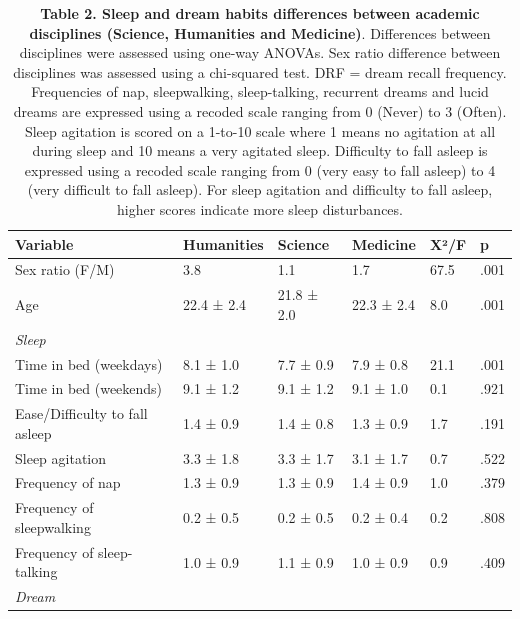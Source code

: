 
\begin{table}[!htb]
    \caption*{\textbf{Table 2. Sleep and dream habits differences between academic disciplines (Science, Humanities and Medicine)}. Differences between disciplines were assessed using one-way ANOVAs. Sex ratio difference between disciplines was assessed using a chi-squared test. DRF = dream recall frequency. Frequencies of nap, sleepwalking, sleep-talking, recurrent dreams and lucid dreams are expressed using a recoded scale ranging from 0 (Never) to 3 (Often). Sleep agitation is scored on a 1-to-10 scale where 1 means no agitation at all during sleep and 10 means a very agitated sleep. Difficulty to fall asleep is expressed using a recoded scale ranging from 0 (very easy to fall asleep) to 4 (very difficult to fall asleep). For sleep agitation and difficulty to fall asleep, higher scores indicate more sleep disturbances.}
    \begin{tabularx}{\textwidth}{bXXXll}
    \toprule
    Variable                       & Humanities & Science    & Medicine   & X²/F   & p    \\ \midrule
    Sex ratio (F/M)                & 3.8        & 1.1        & 1.7        & 67.5   & .001 \\
    Age                            & 22.4 ± 2.4 & 21.8 ± 2.0 & 22.3 ± 2.4 & 8.0    & .001 \\
    \emph{Sleep}                   &            &            &            &        &      \\
    Time in bed (weekdays)         & 8.1 ± 1.0  & 7.7 ± 0.9  & 7.9 ± 0.8  & 21.1   & .001 \\
    Time in bed (weekends)         & 9.1 ± 1.2  & 9.1 ± 1.2  & 9.1 ± 1.0  & 0.1    & .921 \\
    Ease/Difficulty to fall asleep & 1.4 ± 0.9  & 1.4 ± 0.8  & 1.3 ± 0.9  & 1.7    & .191 \\
    Sleep agitation                & 3.3 ± 1.8  & 3.3 ± 1.7  & 3.1 ± 1.7  & 0.7    & .522 \\
    Frequency of nap               & 1.3 ± 0.9  & 1.3 ± 0.9  & 1.4 ± 0.9  & 1.0    & .379 \\
    Frequency of sleepwalking      & 0.2 ± 0.5  & 0.2 ± 0.5  & 0.2 ± 0.4  & 0.2    & .808 \\
    Frequency of sleep-talking     & 1.0 ± 0.9  & 1.1 ± 0.9  & 1.0 ± 0.9  & 0.9    & .409 \\
    \emph{Dream}                   &            &            &            &        &      \\

\end{tabularx}
\end{table}

